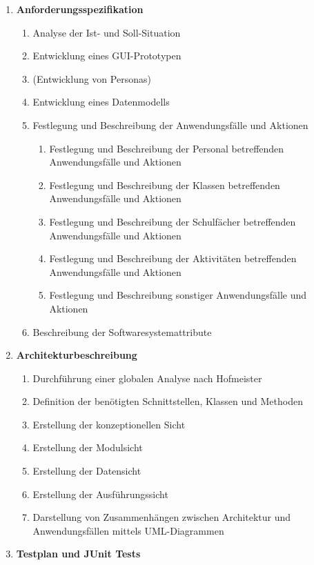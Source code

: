 \documentclass[fontsize=12pt,paper=a4,twoside]{scrartcl}
\begin{document}
\begin{enumerate}
\item \textbf{Anforderungsspezifikation}
	\begin{enumerate}[label={(\arabic*)}]
	\item Analyse der Ist- und Soll-Situation
	\item Entwicklung eines GUI-Prototypen
	\item (Entwicklung von Personas)
	\item Entwicklung eines Datenmodells
	\item Festlegung und Beschreibung der Anwendungsfälle und Aktionen
		\begin{enumerate}[label={(\arabic*)}]
		\item Festlegung und Beschreibung der Personal betreffenden Anwendungsfälle und Aktionen
		\item Festlegung und Beschreibung der Klassen betreffenden Anwendungsfälle und Aktionen
		\item Festlegung und Beschreibung der Schulfächer betreffenden Anwendungsfälle und Aktionen
		\item Festlegung und Beschreibung der Aktivitäten betreffenden Anwendungsfälle und Aktionen
		\item Festlegung und Beschreibung sonstiger Anwendungsfälle und Aktionen
		\end{enumerate}
	\item Beschreibung der Softwaresystemattribute
	\end{enumerate}	
\item \textbf{Architekturbeschreibung}
	\begin{enumerate}[label={(\arabic*)}]
	\item Durchführung einer globalen Analyse nach Hofmeister
	\item Definition der benötigten Schnittstellen, Klassen und Methoden
	\item Erstellung der konzeptionellen Sicht
	\item Erstellung der Modulsicht
	\item Erstellung der Datensicht
	\item Erstellung der Ausführungssicht
	\item Darstellung von Zusammenhängen zwischen Architektur und Anwendungsfällen mittels UML-Diagrammen
	\end{enumerate}
\item \textbf{Testplan und JUnit Tests}
		\begin{enumerate}[label={(\arabic*)}]

\end{enumerate}
\end{enumerate}
\end{document}
